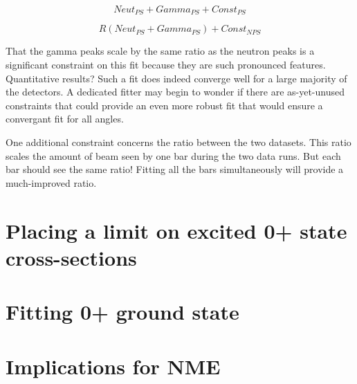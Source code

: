 \begin{equation}
Neut_{PS} + Gamma_{PS} + Const_{PS}
\end{equation}

\begin{equation}
R(Neut_{PS} + Gamma_{PS}) + Const_{NPS}
\end{equation}

That the gamma peaks scale by the same ratio as the neutron peaks is a significant constraint on this fit because they are such pronounced features.  Quantitative results?  Such a fit does indeed converge well for a large majority of the detectors.  A dedicated fitter may begin to wonder if there are as-yet-unused constraints that could provide an even more robust fit that would ensure a convergant fit for all angles.

One additional constraint concerns the ratio between the two datasets.  This ratio scales the amount of beam seen by one bar during the two data runs.  But each bar should see the same ratio!  Fitting all the bars simultaneously will provide a much-improved ratio.




\section{Placing a limit on excited 0+ state cross-sections}

\section{Fitting 0+ ground state}

\section{Implications for \zvbb NME}

%
% 
% 
